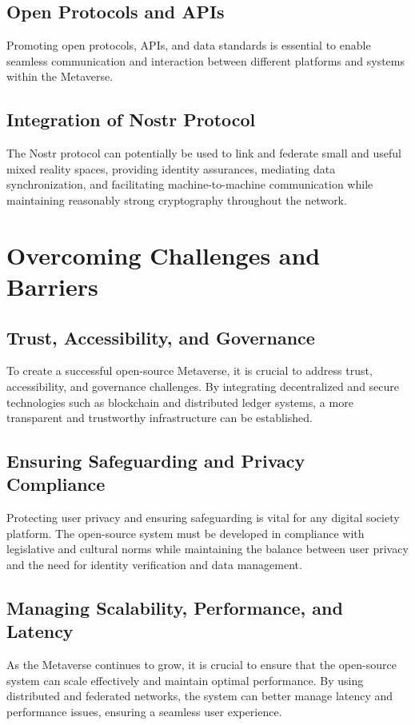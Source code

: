 \subsection{Open Protocols and APIs}
Promoting open protocols, APIs, and data standards is essential to enable seamless communication and interaction between different platforms and systems within the Metaverse.
\subsection{Integration of Nostr Protocol}
The Nostr protocol can potentially be used to link and federate small and useful mixed reality spaces, providing identity assurances, mediating data synchronization, and facilitating machine-to-machine communication while maintaining reasonably strong cryptography throughout the network.



\section{Overcoming Challenges and Barriers}
\subsection{Trust, Accessibility, and Governance}
To create a successful open-source Metaverse, it is crucial to address trust, accessibility, and governance challenges. By integrating decentralized and secure technologies such as blockchain and distributed ledger systems, a more transparent and trustworthy infrastructure can be established.

\subsection{Ensuring Safeguarding and Privacy Compliance}
Protecting user privacy and ensuring safeguarding is vital for any digital society platform. The open-source system must be developed in compliance with legislative and cultural norms while maintaining the balance between user privacy and the need for identity verification and data management.

\subsection{Managing Scalability, Performance, and Latency}
As the Metaverse continues to grow, it is crucial to ensure that the open-source system can scale effectively and maintain optimal performance. By using distributed and federated networks, the system can better manage latency and performance issues, ensuring a seamless user experience.

